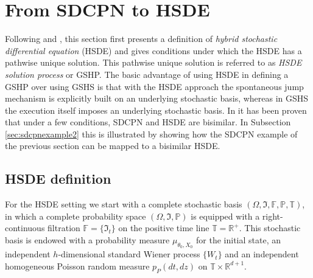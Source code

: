 \documentclass[copyright,creativecommons]{eptcs}
\begin{document}
\section{From SDCPN to HSDE}\label{sec:hsde}

Following \cite{Blom2003} and
\cite{BlomBakkerEverdijPark2003b}, this section first presents
a definition of \emph{hybrid stochastic differential equation} (HSDE) and gives conditions
under which the HSDE has a pathwise unique solution. This pathwise
unique solution is referred to as \emph{HSDE solution process} or
GSHP. The basic advantage of using HSDE in defining a GSHP over
using GSHS is that with the HSDE approach the spontaneous jump
mechanism is explicitly built on an underlying stochastic basis,
whereas in GSHS the execution itself imposes an underlying
stochastic basis.
In \cite{EverdijBlom2009} it has been proven that
under a few conditions, SDCPN and HSDE are bisimilar. In
Subsection \ref{sec:sdcpnexample2} this is illustrated
by showing how the SDCPN example of the previous section can be
mapped to a bisimilar HSDE.



\subsection{HSDE definition}

For the HSDE setting we start with a complete stochastic basis
$(\Omega, \Im, \mathbb{F}, \mathbb{P}, \mathbb{T})$, in which a
complete probability space $(\Omega, \Im, \mathbb{P})$ is equipped
with a right-continuous filtration $\mathbb{F} = \{\Im_t\}$ on the
positive time line $\mathbb{T}=\mathbb{R}^{+}$. This stochastic
basis is endowed with a probability measure $\mu_{\theta_0, X_0}$
for the initial state,
an independent $h$-dimensional standard Wiener process $\{W_t\}$ and an
independent homogeneous Poisson random measure $p_P(dt,dz)$ on
$\mathbb{T} \times \mathbb{R}^{d+1}$.
\end{document}
